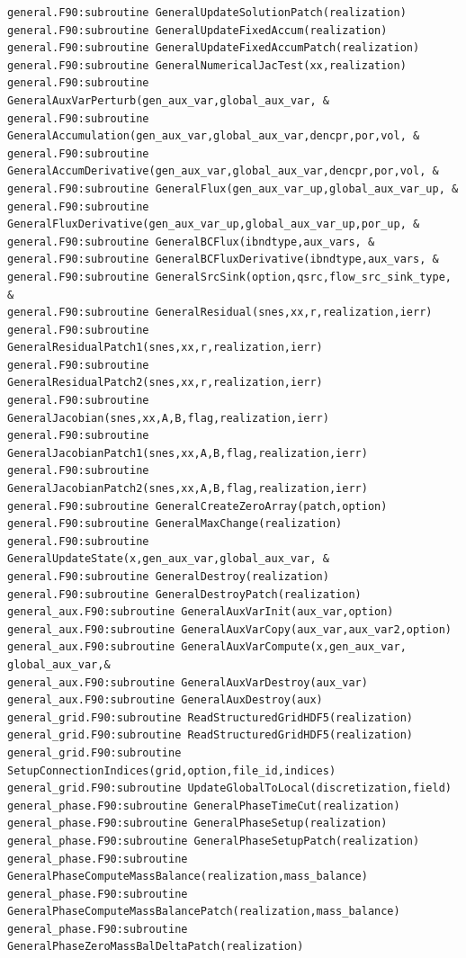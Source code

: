 \documentclass[12pt]{article}
\begin{document}
\begin{verbatim}
general.F90:subroutine GeneralUpdateSolutionPatch(realization)
general.F90:subroutine GeneralUpdateFixedAccum(realization)
general.F90:subroutine GeneralUpdateFixedAccumPatch(realization)
general.F90:subroutine GeneralNumericalJacTest(xx,realization)
general.F90:subroutine GeneralAuxVarPerturb(gen_aux_var,global_aux_var, &
general.F90:subroutine GeneralAccumulation(gen_aux_var,global_aux_var,dencpr,por,vol, &
general.F90:subroutine GeneralAccumDerivative(gen_aux_var,global_aux_var,dencpr,por,vol, &
general.F90:subroutine GeneralFlux(gen_aux_var_up,global_aux_var_up, &
general.F90:subroutine GeneralFluxDerivative(gen_aux_var_up,global_aux_var_up,por_up, &
general.F90:subroutine GeneralBCFlux(ibndtype,aux_vars, &
general.F90:subroutine GeneralBCFluxDerivative(ibndtype,aux_vars, &
general.F90:subroutine GeneralSrcSink(option,qsrc,flow_src_sink_type, &
general.F90:subroutine GeneralResidual(snes,xx,r,realization,ierr)
general.F90:subroutine GeneralResidualPatch1(snes,xx,r,realization,ierr)
general.F90:subroutine GeneralResidualPatch2(snes,xx,r,realization,ierr)
general.F90:subroutine GeneralJacobian(snes,xx,A,B,flag,realization,ierr)
general.F90:subroutine GeneralJacobianPatch1(snes,xx,A,B,flag,realization,ierr)
general.F90:subroutine GeneralJacobianPatch2(snes,xx,A,B,flag,realization,ierr)
general.F90:subroutine GeneralCreateZeroArray(patch,option)
general.F90:subroutine GeneralMaxChange(realization)
general.F90:subroutine GeneralUpdateState(x,gen_aux_var,global_aux_var, &
general.F90:subroutine GeneralDestroy(realization)
general.F90:subroutine GeneralDestroyPatch(realization)
general_aux.F90:subroutine GeneralAuxVarInit(aux_var,option)
general_aux.F90:subroutine GeneralAuxVarCopy(aux_var,aux_var2,option)
general_aux.F90:subroutine GeneralAuxVarCompute(x,gen_aux_var, global_aux_var,&
general_aux.F90:subroutine GeneralAuxVarDestroy(aux_var)
general_aux.F90:subroutine GeneralAuxDestroy(aux)
general_grid.F90:subroutine ReadStructuredGridHDF5(realization)
general_grid.F90:subroutine ReadStructuredGridHDF5(realization)
general_grid.F90:subroutine SetupConnectionIndices(grid,option,file_id,indices)
general_grid.F90:subroutine UpdateGlobalToLocal(discretization,field)
general_phase.F90:subroutine GeneralPhaseTimeCut(realization)
general_phase.F90:subroutine GeneralPhaseSetup(realization)
general_phase.F90:subroutine GeneralPhaseSetupPatch(realization)
general_phase.F90:subroutine GeneralPhaseComputeMassBalance(realization,mass_balance)
general_phase.F90:subroutine GeneralPhaseComputeMassBalancePatch(realization,mass_balance)
general_phase.F90:subroutine GeneralPhaseZeroMassBalDeltaPatch(realization)

\end{verbatim}
\end{document}
